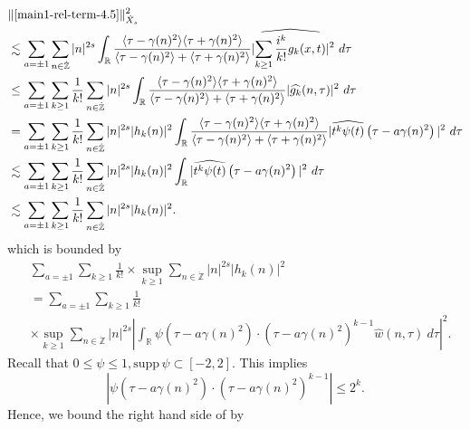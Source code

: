 \documentclass[12pt,reqno]{amsart}
\numberwithin{equation}{section}  %
\renewcommand{\cref}{\Cref}
\newcommand{\rr}{\mathbb{R}}
\newcommand{\zz}{\mathbb{Z}}
\newcommand{\zzdot}{\dot{\zz}}
\newcommand{\wh}{\widehat}
\begin{document}
\begin{equation}
\label{2n}
\begin{split}
& \|\cref{main1-rel-term-4.5}\|_{\dot{X}_{s}}^{2}
\\
& \lesssim \sum_{a = \pm 1} \sum_{n \in \zzdot} |n|^{2s}
\int_\rr 
\frac{\langle \tau - \gamma(n)^{2} \rangle  \langle \tau + \gamma(n)^{2} \rangle }{\langle \tau - \gamma(n)^{2} \rangle  + \langle \tau + \gamma(n)^{2} \rangle }
| \wh{\sum_{k \ge 1} \frac{i^k}{k!}g_k(x,t)} |^2 \ d \tau
\\
& \le \sum_{a = \pm 1}\sum_{k \ge 1} \frac{1}{k!}\sum_{n \in \zzdot} |n|^{2s}
\int_\rr  \frac{\langle \tau - \gamma(n)^{2} \rangle  \langle \tau + \gamma(n)^{2} \rangle }{\langle \tau - \gamma(n)^{2} \rangle  + \langle \tau + \gamma(n)^{2} \rangle }
| \wh{g_k}(n, \tau) |^2 \
d \tau 
\\
& = \sum_{a = \pm 1}\sum_{k \ge 1} \frac{1}{k!} \sum_{n \in \zzdot} |n|^{2s} |
h_k(n) |^2 \int_\rr  \frac{\langle \tau - \gamma(n)^{2} \rangle  \langle \tau + \gamma(n)^{2} \rangle }{\langle \tau - \gamma(n)^{2} \rangle  + \langle \tau + \gamma(n)^{2} \rangle }
| \wh{t^k
\psi(t)} \left( \tau - a\gamma(n)^{2} \right) |^2 \ d \tau 
\\
& \lesssim
\sum_{a = \pm 1}\sum_{k \ge 1} \frac{1}{k!} \sum_{n \in \zzdot} |n|^{2s} |
h_k(n) |^2 \int_\rr  
| \wh{t^k
\psi(t)} \left( \tau - a\gamma(n)^{2} \right) |^2 \ d \tau
\\
& \lesssim 
\sum_{a = \pm 1}\sum_{k \ge 1} \frac{1}{k!} \sum_{n \in \zzdot} |n|^{2s} |
h_k(n) |^2. 
\end{split}
\end{equation}
which is bounded by
\begin{equation}
\label{5n}
\begin{split}
&  \sum_{a = \pm 1} \sum_{k \ge 1} \frac{1}{k!}
\times \sup_{k \ge 1}  \sum_{n \in \zzdot} |n|^{2s} | 
h_k(n) |^2 
\\
& = \sum_{a = \pm 1}\sum_{k \ge 1} \frac{1}{k!}
\\
& \times \sup_{k \ge 1} 
\sum_{n \in \zzdot} |n|^{2s} |\int_\rr 
\psi\left( \tau - a\gamma(n)^{2} \right) \cdot \left( \tau - a\gamma(n)^{2} 
\right)^{k -1} \wh{w}(n, \tau) \ d \tau|^{2}. 
\end{split}
\end{equation}
Recall that $0 \le \psi \le 1, \text{supp} \, \psi \subset [-2,2 ]$. 
This implies
$$| \psi\left( \tau - a\gamma(n)^{2} \right) \cdot \left( \tau - a\gamma(n)^{2}
\right)^{k -1} | \le 2^{k}.$$ Hence,
we bound the right hand side of \cref{5n} by
\end{document}

